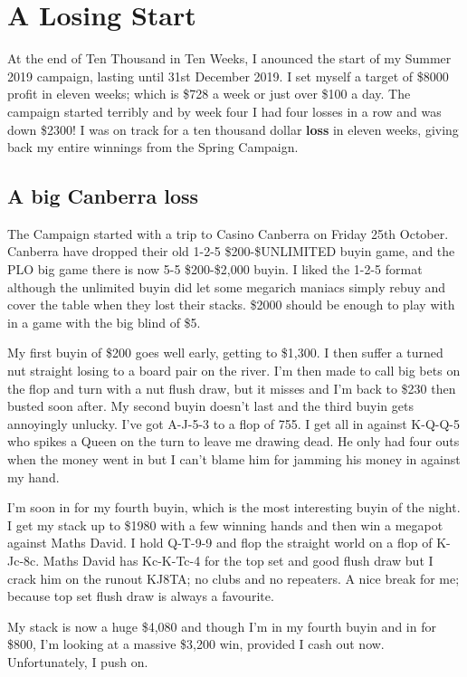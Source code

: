 \chapter{A Losing Start}

At the end of Ten Thousand in Ten Weeks, I anounced the start of my
Summer 2019 campaign, lasting until 31st December 2019. I set myself a
target of \$8000 profit in eleven weeks; which is \$728 a week or just
over \$100 a day. The campaign started terribly and by week four I had
four losses in a row and was down \$2300! I was on track for a ten
thousand dollar \textbf{loss} in eleven weeks, giving back my entire
winnings from the Spring Campaign.

\section*{A big Canberra loss}

The Campaign started with a trip to Casino Canberra on Friday 25th
October. Canberra have dropped their old 1-2-5 \$200-\$UNLIMITED buyin
game, and the PLO big game there is now 5-5 \$200-\$2,000 buyin. I
liked the 1-2-5 format although the unlimited buyin did let some
megarich maniacs simply rebuy and cover the table when they lost their
stacks. \$2000 should be enough to play with in a game with the big
blind of \$5.

My first buyin of \$200 goes well early, getting to \$1,300. I then
suffer a turned nut straight losing to a board pair on the river. I'm
then made to call big bets on the flop and turn with a nut flush draw,
but it misses and I'm back to \$230 then busted soon after. My second
buyin doesn't last and the third buyin gets annoyingly unlucky. I've
got A-J-5-3 to a flop of 755. I get all in against K-Q-Q-5 who spikes
a Queen on the turn to leave me drawing dead. He only had four outs
when the money went in but I can't blame him for jamming his money in
against my hand.

I'm soon in for my fourth buyin, which is the most interesting buyin
of the night. I get my stack up to \$1980 with a few winning hands and
then win a megapot against Maths David. I hold Q-T-9-9 and flop the
straight world on a flop of K-Jc-8c. Maths David has Kc-K-Tc-4 for the
top set and good flush draw but I crack him on the runout KJ8TA; no
clubs and no repeaters. A nice break for me; because top set flush
draw is always a favourite.

My stack is now a huge \$4,080 and though I'm in my fourth buyin
and in for \$800, I'm looking at a massive \$3,200 win, provided I cash out
now. Unfortunately, I push on.

